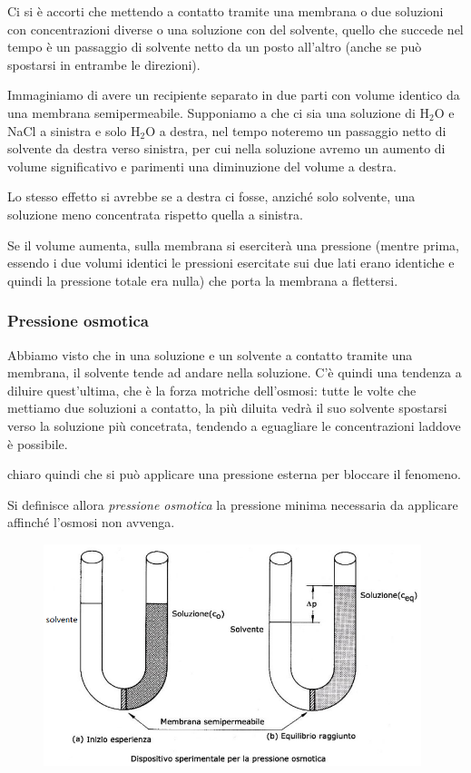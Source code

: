 \vspace{0.3cm}Ci si è accorti che mettendo a contatto tramite una membrana o due soluzioni con concentrazioni diverse o una soluzione con del solvente, quello che succede nel tempo è un passaggio di solvente netto da un posto all'altro (anche se può spostarsi in entrambe le direzioni).

Immaginiamo di avere un recipiente separato in due parti con volume identico da una membrana semipermeabile. Supponiamo a che ci sia una soluzione di H$_2$O e NaCl a sinistra e solo H$_2$O a destra, nel tempo noteremo un passaggio netto di solvente da destra verso sinistra, per cui nella soluzione avremo un aumento di volume significativo e parimenti una diminuzione del volume a destra.

Lo stesso effetto si avrebbe se a destra ci fosse, anziché solo solvente, una soluzione meno concentrata rispetto quella a sinistra.

Se il volume aumenta, sulla membrana si eserciterà una pressione (mentre prima, essendo i due volumi identici le pressioni esercitate sui due lati erano identiche e quindi la pressione totale era nulla) che porta la membrana a flettersi.
\subsubsection{Pressione osmotica}
Abbiamo visto che in una soluzione e un solvente a contatto tramite una membrana, il solvente tende ad andare nella soluzione. C'è quindi una tendenza a diluire quest'ultima, che è la forza motriche dell'osmosi: tutte le volte che mettiamo due soluzioni a contatto, la più diluita vedrà il suo solvente spostarsi verso la soluzione più concetrata, tendendo a eguagliare le concentrazioni laddove è possibile.

\E chiaro quindi che si può applicare una pressione esterna per bloccare il fenomeno.

Si definisce allora \textit{pressione osmotica} la pressione minima necessaria da applicare affinché l'osmosi non avvenga.

\begin{figure}[htp]
    \centering
    \includegraphics[width=11cm]{immagini/tubo_a_U.png}
\end{figure}

